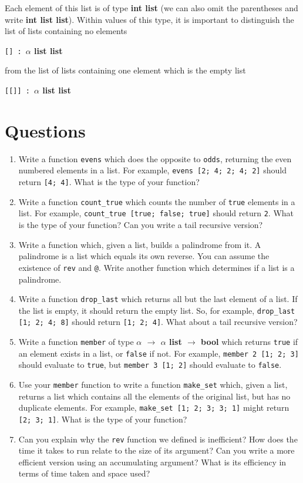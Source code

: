 \documentclass[]{book}
\newcommand{\smspace}{\vspace{4mm}}
\begin{document}
\noindent Each element of this list is of type \textsf{\textbf{int list}} (we can also omit the parentheses and write \textsf{\textbf{int list list}}). Within values of this type, it is important to distinguish the list of lists containing no elements

\smspace
\texttt{[] :}\ \textsf{\textbf{$\alpha$ list list}}
\smspace

\noindent from the list of lists containing one element which is the empty list

\smspace
\texttt{[[]] :}\ \textsf{\textbf{$\alpha$ list list}}
\smspace


\clearpage
\section*{Questions}

\begin{enumerate}
  \item Write a function \texttt{evens} which does the opposite to \texttt{odds}, returning the even numbered elements in a list. For example, \texttt{evens [2; 4; 2; 4; 2]} should return \texttt{[4; 4]}. What is the type of your function?
  \item Write a function \texttt{count\_true} which counts the number of \texttt{true} elements in a list. For example, \texttt{count\_true [true; false; true]} should return \texttt{2}. What is the type of your function? Can you write a tail recursive version?
  \item Write a function which, given a list, builds a palindrome from it. A palindrome is a list which equals its own reverse. You can assume the existence of \texttt{rev} and \texttt{@}. Write another function which determines if a list is a palindrome.
  \item Write a function \texttt{drop\_last} which returns all but the last element of a list. If the list is empty, it should return the empty list. So, for example, \texttt{drop\_last [1; 2; 4; 8]} should return \texttt{[1; 2; 4]}. What about a tail recursive version?
  \item Write a function \texttt{member} of type \textbf{\textsf {$\alpha$ $\rightarrow$ $\alpha$ list $\rightarrow$ bool}} which returns \texttt{true} if an element exists in a list, or \texttt{false} if not. For example, \texttt{member 2 [1; 2; 3]} should evaluate to \texttt{true}, but \texttt{member 3 [1; 2]} should evaluate to \texttt{false}. 
  \item Use your \texttt{member} function to write a function \texttt{make\_set} which, given a list, returns a list which contains all the elements of the original list, but has no duplicate elements. For example, \texttt{make\_set [1; 2; 3; 3; 1]} might return \texttt{[2; 3; 1]}. What is the type of your function?
  \item Can you explain why the \texttt{rev} function we defined is inefficient? How does the time it takes to run relate to the size of its argument? Can you write a more efficient version using an accumulating argument? What is its efficiency in terms of time taken and space used?
\end{enumerate}
\end{document}
